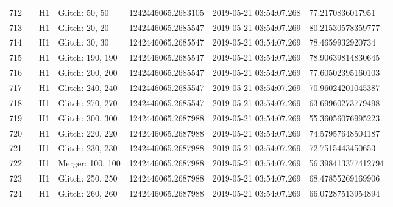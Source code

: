 \begin{longtable}{lllllll}
712  &                                                    &       H1 &    Glitch: 50, 50 &  1242446065.2683105 &  2019-05-21 03:54:07.268 &    77.2170836017951 \\
713  &                                                    &       H1 &    Glitch: 20, 20 &  1242446065.2685547 &  2019-05-21 03:54:07.269 &   80.21530578359777 \\
714  &                                                    &       H1 &    Glitch: 30, 30 &  1242446065.2685547 &  2019-05-21 03:54:07.269 &    78.4659932920734 \\
715  &                                                    &       H1 &  Glitch: 190, 190 &  1242446065.2685547 &  2019-05-21 03:54:07.269 &   78.90639814830645 \\
716  &                                                    &       H1 &  Glitch: 200, 200 &  1242446065.2685547 &  2019-05-21 03:54:07.269 &   77.60502395160103 \\
717  &                                                    &       H1 &  Glitch: 240, 240 &  1242446065.2685547 &  2019-05-21 03:54:07.269 &   70.96024201045387 \\
718  &                                                    &       H1 &  Glitch: 270, 270 &  1242446065.2685547 &  2019-05-21 03:54:07.269 &   63.69960273779498 \\
719  &                                                    &       H1 &  Glitch: 300, 300 &  1242446065.2687988 &  2019-05-21 03:54:07.269 &   55.36056076995223 \\
720  &                                                    &       H1 &  Glitch: 220, 220 &  1242446065.2687988 &  2019-05-21 03:54:07.269 &   74.57957648504187 \\
721  &                                                    &       H1 &  Glitch: 230, 230 &  1242446065.2687988 &  2019-05-21 03:54:07.269 &    72.7515443450653 \\
722  &                                                    &       H1 &  Merger: 100, 100 &  1242446065.2687988 &  2019-05-21 03:54:07.269 &  56.398413377412794 \\
723  &                                                    &       H1 &  Glitch: 250, 250 &  1242446065.2687988 &  2019-05-21 03:54:07.269 &   68.47855269169906 \\
724  &                                                    &       H1 &  Glitch: 260, 260 &  1242446065.2687988 &  2019-05-21 03:54:07.269 &   66.07287513954894 \\

\end{longtable}
